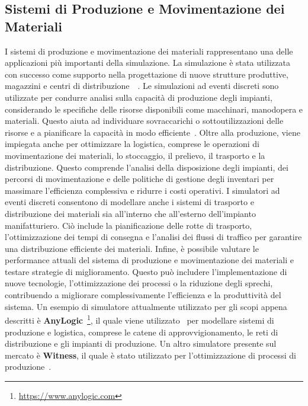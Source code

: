 \documentclass[12pt,a4paper,openright,twoside]{book}
\begin{document}
\subsection{Sistemi di Produzione e Movimentazione dei Materiali}
I sistemi di produzione e movimentazione dei materiali rappresentano una delle applicazioni più importanti della simulazione. La simulazione è stata utilizzata con successo come supporto nella progettazione di nuove strutture produttive, magazzini e centri di distribuzione~\cite{KENDALL1998711}~\cite{Ingemansson2002ASO}.
Le simulazioni ad eventi discreti sono utilizzate per condurre analisi sulla capacità di produzione degli impianti, considerando le specifiche delle risorse disponibili come macchinari, manodopera e materiali. Questo aiuta ad individuare sovraccarichi o sottoutilizzazioni delle risorse e a pianificare la capacità in modo efficiente~\cite{sunmanufacturing}. 
Oltre alla produzione, viene impiegata anche per ottimizzare la logistica, comprese le operazioni di movimentazione dei materiali, lo stoccaggio, il prelievo, il trasporto e la distribuzione. Questo comprende l'analisi della disposizione degli impianti, dei percorsi di movimentazione e delle politiche di gestione degli inventari per massimare l'efficienza complessiva e ridurre i costi operativi. 
I simulatori ad eventi discreti consentono di modellare anche i sistemi di trasporto e distribuzione dei materiali sia all'interno che all'esterno dell'impianto manifatturiero. Ciò include la pianificazione delle rotte di trasporto, l'ottimizzazione dei tempi di consegna e l'analisi dei flussi di traffico per garantire una distribuzione efficiente dei materiali.
Infine, è possibile valutare le performance attuali del sistema di produzione e movimentazione dei materiali e testare strategie di miglioramento. Questo può includere l'implementazione di nuove tecnologie, l'ottimizzazione dei processi o la riduzione degli sprechi, contribuendo a migliorare complessivamente l'efficienza e la produttività del sistema.
Un esempio di simulatore attualmente utilizzato per gli scopi appena descritti è \textbf{AnyLogic}~\footnote{\url{https://www.anylogic.com}}, il quale viene utilizzato~\cite{pr9081362} per modellare sistemi di produzione e logistica, comprese le catene di approvvigionamento, le reti di distribuzione e gli impianti di produzione.  
Un altro simulatore presente sul mercato è \textbf{Witness}, il quale è stato utilizzato per l'ottimizzazione di processi di produzione~\cite{Chramcov}. 
\end{document}
